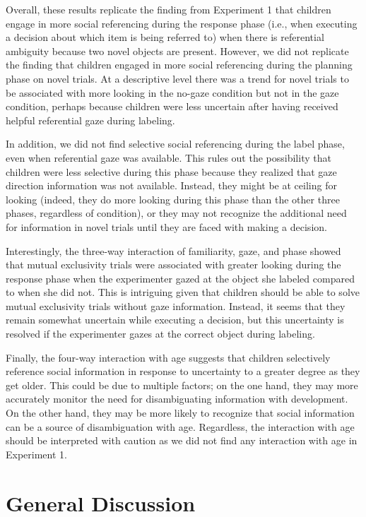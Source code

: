 \documentclass[10pt, letterpaper]{article}
\begin{document}
Overall, these results replicate the finding from Experiment 1 that
children engage in more social referencing during the response phase
(i.e., when executing a decision about which item is being referred to)
when there is referential ambiguity because two novel objects are
present. However, we did not replicate the finding that children engaged
in more social referencing during the planning phase on novel trials. At
a descriptive level there was a trend for novel trials to be associated
with more looking in the no-gaze condition but not in the gaze
condition, perhaps because children were less uncertain after having
received helpful referential gaze during labeling.

In addition, we did not find selective social referencing during the
label phase, even when referential gaze was available. This rules out
the possibility that children were less selective during this phase
because they realized that gaze direction information was not available.
Instead, they might be at ceiling for looking (indeed, they do more
looking during this phase than the other three phases, regardless of
condition), or they may not recognize the additional need for
information in novel trials until they are faced with making a decision.

Interestingly, the three-way interaction of familiarity, gaze, and phase
showed that mutual exclusivity trials were associated with greater
looking during the response phase when the experimenter gazed at the
object she labeled compared to when she did not. This is intriguing
given that children should be able to solve mutual exclusivity trials
without gaze information. Instead, it seems that they remain somewhat
uncertain while executing a decision, but this uncertainty is resolved
if the experimenter gazes at the correct object during labeling.

Finally, the four-way interaction with age suggests that children
selectively reference social information in response to uncertainty to a
greater degree as they get older. This could be due to multiple factors;
on the one hand, they may more accurately monitor the need for
disambiguating information with development. On the other hand, they may
be more likely to recognize that social information can be a source of
disambiguation with age. Regardless, the interaction with age should be
interpreted with caution as we did not find any interaction with age in
Experiment 1.

\section{General Discussion}\label{general-discussion}
\end{document}
